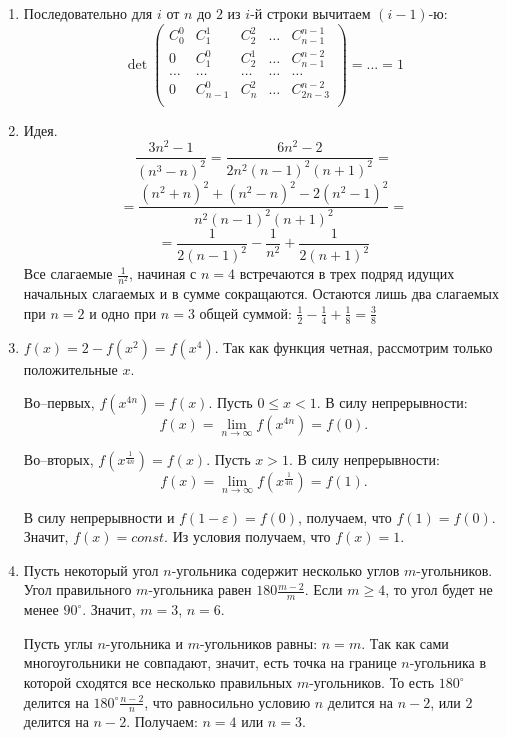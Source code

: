 \begin{enumerate}
\item Последовательно для $i$ от $n$ до $2$ из $i$-й строки вычитаем $(i-1)$-ю:
$$
\det
\begin{pmatrix}
C_{0}^0 & C_{1}^1 & C_{2}^2 & \dots & C_{n-1}^{n-1} \\
0 & C_{1}^0 & C_{2}^1 & \dots & C_{n-1}^{n-2} \\
\dots & \dots & \dots & \dots & \dots \\
0 & C_{n-1}^0 & C_{n}^2 & \dots & C_{2n-3}^{n-2} \\
\end{pmatrix}
= ... = 1
$$

\item Идея.
$$
\frac{3n^2-1}{(n^3 - n)^2} = 
\frac{6n^2-2}{2 n^2 (n-1)^2 (n+1)^2} = 
$$
$$
=\frac{(n^2 + n)^2 + (n^2 - n)^2 - 2(n^2 - 1)^2 }{n^2 (n-1)^2 (n+1)^2}
=
$$
$$
=\frac{1}{2(n-1)^2} - \frac{1}{n^2}+\frac{1}{2(n+1)^2}
$$
Все слагаемые $\frac{1}{n^2}$, начиная с $n = 4$ встречаются в трех подряд идущих начальных слагаемых и в сумме сокращаются. Остаются лишь два слагаемых при $n = 2$ и одно при $n = 3$ общей суммой: $\frac{1}{2} - \frac{1}{4} + \frac{1}{8} = \frac{3}{8}$

\item $f(x) = 2 - f(x^2) = f(x^4)$. Так как функция четная, рассмотрим только положительные $x$.

Во--первых, $f(x^{4n}) = f(x)$. Пусть $0 \leqslant x < 1$. В силу непрерывности:
$$f(x) = \lim_{n \to \infty} f(x^{4n}) = f(0).$$

Во--вторых, $f(x^{\frac{1}{4n}}) = f(x)$. Пусть $x > 1$. В силу непрерывности:
$$f(x) = \lim_{n \to \infty} f(x^{\frac{1}{4n}}) = f(1).$$

В силу непрерывности и $f(1 - \varepsilon) = f(0)$, получаем, что $f(1) = f(0)$. Значит, $f(x) = const$. Из условия получаем, что $f(x) = 1$.

\item Пусть некоторый угол $n$-угольника содержит несколько углов $m$-угольников. Угол правильного $m$-угольника равен $180 \frac{m-2}{m}$. Если $m \geqslant 4$, то угол будет не менее $90^{\circ}$. Значит, $m = 3$, $n = 6$.

Пусть углы $n$-угольника и $m$-угольников равны: $n = m$. Так как сами многоугольники не совпадают, значит, есть точка на границе $n$-угольника в которой сходятся все несколько правильных $m$-угольников. То есть $180^{\circ}$ делится на $180^{\circ} \frac{n-2}{n}$, что равносильно условию $n$ делится на $n-2$, или $2$ делится на $n-2$. Получаем: $n = 4$ или $n = 3$.


\end{enumerate}
